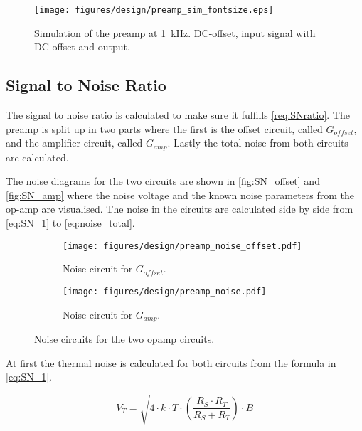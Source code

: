 \begin{figure}[htbp]
	\centering
	\texttt{[image: figures/design/preamp\_sim\_fontsize.eps]}
	\caption{Simulation of the \gls{preamp} at \SI{1}{\kilo\hertz}. \color{red} DC-offset\color{black}, \color{blue} input signal with DC-offset \color{black} and \color{green} output\color{black}.}
	\label{fig:preamp_sim} 
\end{figure}

\subsection{Signal to Noise Ratio}
The signal to noise ratio is calculated to make sure it fulfills \autoref{req:SNratio}. The \gls{preamp} is split up in two parts where the first is the offset circuit, called $G_{offset}$, and the amplifier circuit, called $G_{amp}$. Lastly the total noise from both circuits are calculated.

The noise diagrams for the two circuits are shown in \autoref{fig:SN_offset} and \autoref{fig:SN_amp} where the noise voltage and the known noise parameters from the op-amp are visualised. The noise in the circuits are calculated side by side from \autoref{eq:SN_1} to \autoref{eq:noise_total}. 


\begin{figure}[H]
\centering
\begin{subfigure}{.8\textwidth}
	\centering
	\texttt{[image: figures/design/preamp\_noise\_offset.pdf]}
	\caption{Noise circuit for $G_{offset}$.}
	\label{fig:SN_offset}
\end{subfigure}%

\begin{subfigure}{.8\textwidth}
	\centering
	\texttt{[image: figures/design/preamp\_noise.pdf]}
	\caption{Noise circuit for $G_{amp}$.}
	\label{fig:SN_amp}
\end{subfigure}
\caption{Noise circuits for the two \gls{opamp} circuits.}
\label{fig:op_amp_noise_2}
\end{figure}

At first the thermal noise is calculated for both circuits from the formula in \autoref{eq:SN_1}.


\begin{equation}\label{eq:SN_1}
	V_T = \sqrt{4 \cdot k \cdot T \cdot \left( \frac{R_S \cdot R_T }{R_S + R_T } \right) \cdot B}
\end{equation}

\startexplain
\stopexplain

